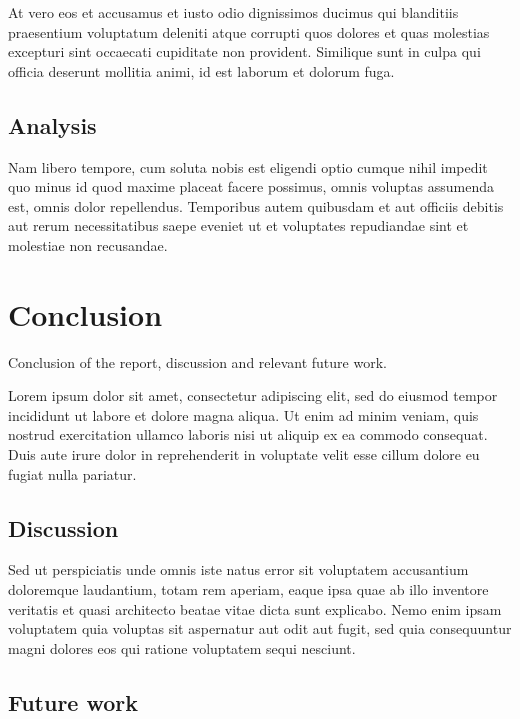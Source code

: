 \documentclass[conference]{IEEEtran}
\begin{document}
At vero eos et accusamus et iusto odio dignissimos ducimus qui blanditiis praesentium voluptatum deleniti atque corrupti quos dolores et quas molestias excepturi sint occaecati cupiditate non provident. Similique sunt in culpa qui officia deserunt mollitia animi, id est laborum et dolorum fuga.

\subsection{Analysis}
\label{sec:analysis}

Nam libero tempore, cum soluta nobis est eligendi optio cumque nihil impedit quo minus id quod maxime placeat facere possimus, omnis voluptas assumenda est, omnis dolor repellendus. Temporibus autem quibusdam et aut officiis debitis aut rerum necessitatibus saepe eveniet ut et voluptates repudiandae sint et molestiae non recusandae.

\section{Conclusion}
\label{sec:conclusion}
Conclusion of the report, discussion and relevant future work.

Lorem ipsum dolor sit amet, consectetur adipiscing elit, sed do eiusmod tempor incididunt ut labore et dolore magna aliqua. Ut enim ad minim veniam, quis nostrud exercitation ullamco laboris nisi ut aliquip ex ea commodo consequat. Duis aute irure dolor in reprehenderit in voluptate velit esse cillum dolore eu fugiat nulla pariatur.

\subsection{Discussion}
\label{sec:Discussion}

Sed ut perspiciatis unde omnis iste natus error sit voluptatem accusantium doloremque laudantium, totam rem aperiam, eaque ipsa quae ab illo inventore veritatis et quasi architecto beatae vitae dicta sunt explicabo. Nemo enim ipsam voluptatem quia voluptas sit aspernatur aut odit aut fugit, sed quia consequuntur magni dolores eos qui ratione voluptatem sequi nesciunt.

\subsection{Future work}
\label{sec:future_work}
\end{document}
